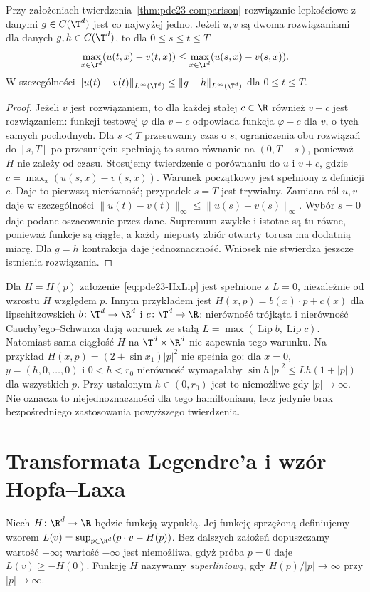 \begin{wniosek}
\label{cor:pde23-contract}
Przy założeniach twierdzenia~\ref{thm:pde23-comparison}
rozwiązanie lepkościowe z danymi $g\in C(\T^d)$ jest
co najwyżej jedno. Jeżeli $u,v$ są dwoma rozwiązaniami
dla danych $g,h\in C(\T^d)$, to dla $0\le s\le t\le T$
\[
 \max_{x\in\T^d}(u(t,x)-v(t,x))
 \le\max_{x\in\T^d}(u(s,x)-v(s,x)).
\]
W szczególności
$\|u(t)-v(t)\|_{L^\infty(\T^d)}
\le\|g-h\|_{L^\infty(\T^d)}$ dla $0\le t\le T$.
\end{wniosek}
\begin{proof}
Jeżeli $v$ jest rozwiązaniem, to dla każdej
stałej $c\in\R$ również $v+c$ jest rozwiązaniem:
funkcji testowej $\varphi$ dla $v+c$ odpowiada
funkcja $\varphi-c$ dla $v$, o tych samych pochodnych.
Dla $s<T$ przesuwamy czas o $s$; ograniczenia
obu rozwiązań do $[s,T]$ po przesunięciu
spełniają to samo równanie na $(0,T-s)$,
ponieważ $H$ nie zależy od czasu.
Stosujemy twierdzenie o porównaniu do $u$
i $v+c$, gdzie $c=\max_x(u(s,x)-v(s,x))$.
Warunek początkowy jest spełniony z definicji $c$.
Daje to pierwszą nierówność; przypadek $s=T$
jest trywialny.
Zamiana ról $u,v$ daje w szczególności
$\|u(t)-v(t)\|_\infty\le\|u(s)-v(s)\|_\infty$.
Wybór $s=0$ daje podane oszacowanie przez dane.
Supremum zwykłe i istotne są tu równe,
ponieważ funkcje są ciągłe, a każdy niepusty
zbiór otwarty torusa ma dodatnią miarę.
Dla $g=h$ kontrakcja daje jednoznaczność.
Wniosek nie stwierdza jeszcze istnienia rozwiązania.
\end{proof}

\begin{uwaga}
Dla $H=H(p)$ założenie~\eqref{eq:pde23-HxLip}
jest spełnione z $L=0$, niezależnie od wzrostu
$H$ względem $p$. Innym przykładem jest
$H(x,p)=b(x)\cdot p+c(x)$ dla lipschitzowskich
$b\colon\T^d\to\R^d$ i $c\colon\T^d\to\R$:
nierówność trójkąta i nierówność
Cauchy'ego--Schwarza dają warunek ze stałą
$L=\max(\operatorname{Lip}b,\operatorname{Lip}c)$.
Natomiast sama ciągłość $H$ na $\T^d\times\R^d$
nie zapewnia tego warunku. Na przykład
$H(x,p)=(2+\sin x_1)|p|^2$ nie spełnia go:
dla $x=0$, $y=(h,0,\ldots,0)$ i $0<h<r_0$
nierówność wymagałaby
$\sin h\,|p|^2\le Lh(1+|p|)$ dla wszystkich $p$.
Przy ustalonym $h\in(0,r_0)$ jest to niemożliwe
gdy $|p|\to\infty$.
Nie oznacza to niejednoznaczności dla tego
hamiltonianu, lecz jedynie brak bezpośredniego
zastosowania powyższego twierdzenia.
\end{uwaga}

\section{Transformata Legendre'a i wzór Hopfa--Laxa}
\begin{definicja}
Niech $H\colon\R^d\to\R$ będzie funkcją wypukłą.
Jej funkcję sprzężoną definiujemy wzorem
$L(v)=\sup_{p\in\R^d}(p\cdot v-H(p))$.
Bez dalszych założeń dopuszczamy wartość $+\infty$;
wartość $-\infty$ jest niemożliwa, gdyż próba $p=0$
daje $L(v)\ge-H(0)$.
Funkcję $H$ nazywamy \emph{superliniową}, gdy
$H(p)/|p|\to\infty$ przy $|p|\to\infty$.
\end{definicja}

